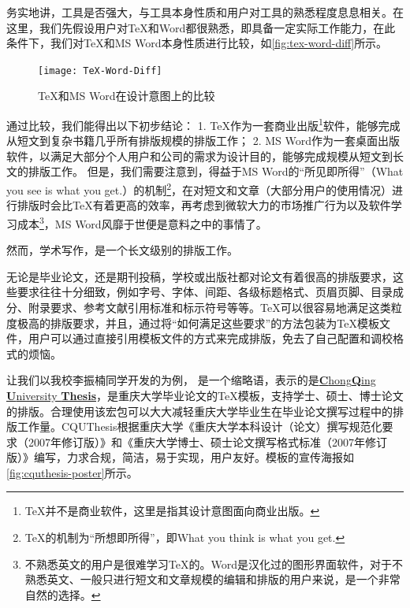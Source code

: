 务实地讲，工具是否强大，与工具本身性质和用户对工具的熟悉程度息息相关。在这里，我们先假设用户对\TeX 和Word都很熟悉，即具备一定实际工作能力，在此条件下，我们对\TeX 和MS Word本身性质进行比较，如\autoref{fig:tex-word-diff}所示。

\begin{figure}[tbh]
\centering
\texttt{[image: TeX-Word-Diff]}
\caption{\TeX 和MS Word在设计意图上的比较}
\label{fig:tex-word-diff}
\end{figure}

通过比较，我们能得出以下初步结论：
1. \TeX 作为一套商业出版\footnote{\TeX 并不是商业软件，这里是指其设计意图面向商业出版。}软件，能够完成从短文到复杂书籍几乎所有排版规模的排版工作；
2. MS Word作为一套桌面出版软件，以满足大部分个人用户和公司的需求为设计目的，能够完成规模从短文到长文的排版工作。
但是，我们需要注意到，得益于MS Word的“所见即所得”（What you see is what you get.）的机制\footnote{\TeX 的机制为“所想即所得”，即What you think is what you get.}，在对短文和文章（大部分用户的使用情况）进行排版时会比\TeX 有着更高的效率，再考虑到微软大力的市场推广行为以及软件学习成本\footnote{不熟悉英文的用户是很难学习\TeX 的。Word是汉化过的图形界面软件，对于不熟悉英文、一般只进行短文和文章规模的编辑和排版的用户来说，是一个非常自然的选择。}，MS Word风靡于世便是意料之中的事情了。

然而，学术写作，是一个长文级别的排版工作。

无论是毕业论文，还是期刊投稿，学校或出版社都对论文有着很高的排版要求，这些要求往往十分细致，例如字号、字体、间距、各级标题格式、页眉页脚、目录成分、附录要求、参考文献引用标准和标示符号等等。\TeX 可以很容易地满足这类粒度极高的排版要求，并且，通过将“如何满足这些要求”的方法包装为\TeX 模板文件，用户可以通过直接引用模板文件的方式来完成排版，免去了自己配置和调校格式的烦恼。

让我们以我校李振楠同学开发的\cquthesis 为例，\href{https://github.com/nanmu42/CQUThesis}{\cquthesis} 是一个缩略语，表示的是\href{https://github.com/nanmu42/CQUThesis}{\textbf{C}hong\textbf{Q}ing \textbf{U}niversity \textbf{Thesis}}，是重庆大学毕业论文的\TeX 模板，支持学士、硕士、博士论文的排版。合理使用该宏包可以大大减轻重庆大学毕业生在毕业论文撰写过程中的排版工作量。CQUThesis根据重庆大学《重庆大学本科设计（论文）撰写规范化要求（2007年修订版）》和《重庆大学博士、硕士论文撰写格式标准（2007年修订版）》编写，力求合规，简洁，易于实现，用户友好。模板的宣传海报如\autoref{fig:cquthesis-poster}所示。

